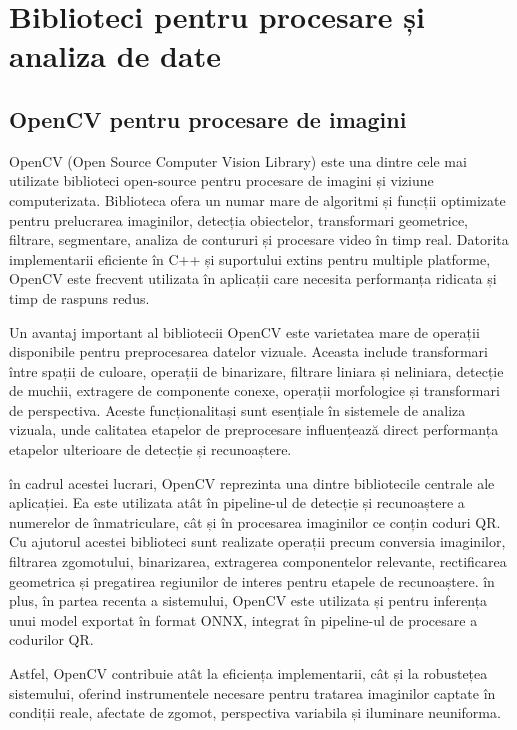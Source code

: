 \section{Biblioteci pentru procesare și analiza de date}

\subsection*{OpenCV pentru procesare de imagini}

OpenCV (Open Source Computer Vision Library) este una dintre cele mai utilizate biblioteci open-source pentru procesare de imagini și viziune computerizata. Biblioteca ofera un numar mare de algoritmi și funcții optimizate pentru prelucrarea imaginilor, detecția obiectelor, transformari geometrice, filtrare, segmentare, analiza de contururi și procesare video în timp real. Datorita implementarii eficiente în C++ și suportului extins pentru multiple platforme, OpenCV este frecvent utilizata în aplicații care necesita performanța ridicata și timp de raspuns redus.

Un avantaj important al bibliotecii OpenCV este varietatea mare de operații disponibile pentru preprocesarea datelor vizuale. Aceasta include transformari între spații de culoare, operații de binarizare, filtrare liniara și neliniara, detecție de muchii, extragere de componente conexe, operații morfologice și transformari de perspectiva. Aceste funcționalitași sunt esențiale în sistemele de analiza vizuala, unde calitatea etapelor de preprocesare influențează direct performanța etapelor ulterioare de detecție și recunoaștere.

în cadrul acestei lucrari, OpenCV reprezinta una dintre bibliotecile centrale ale aplicației. Ea este utilizata atât în pipeline-ul de detecție și recunoaștere a numerelor de înmatriculare, cât și în procesarea imaginilor ce conțin coduri QR. Cu ajutorul acestei biblioteci sunt realizate operații precum conversia imaginilor, filtrarea zgomotului, binarizarea, extragerea componentelor relevante, rectificarea geometrica și pregatirea regiunilor de interes pentru etapele de recunoaștere. în plus, în partea recenta a sistemului, OpenCV este utilizata și pentru inferența unui model exportat în format ONNX, integrat în pipeline-ul de procesare a codurilor QR.

Astfel, OpenCV contribuie atât la eficiența implementarii, cât și la robustețea sistemului, oferind instrumentele necesare pentru tratarea imaginilor captate în condiții reale, afectate de zgomot, perspectiva variabila și iluminare neuniforma.

